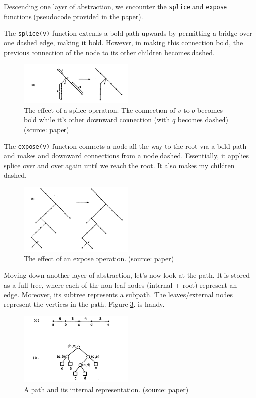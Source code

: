 \documentclass[a4paper, 11pt]{article}
\begin{document}
Descending one layer of abstraction, we encounter the \texttt{splice} and \texttt{expose} functions (pseudocode provided in the paper). 

The \texttt{splice(v)} function extends a bold path upwards by permitting a bridge over one dashed edge, making it bold. However, in making this connection bold, the previous connection of the node to its other children becomes dashed.

\begin{figure}
    \centering
    \includegraphics[width=0.5\textwidth]{img/diagrams/splice.png}
    \caption{The effect of a splice operation. The connection of $v$ to $p$ becomes bold while it's other downward connection (with $q$ becomes dashed) (source: paper)}
    \label{fig:2}
\end{figure}

The \texttt{expose(v)} function connects a node all the way to the root via a bold path and makes and downward connections from a node dashed. Essentially, it applies splice over and over again until we reach the root. It also makes my children dashed.

\begin{figure}
    \centering
    \includegraphics[width=0.5\textwidth]{img/diagrams/expose.png}
    \caption{The effect of an expose operation.  (source: paper)}
    \label{fig:3}
\end{figure}

Moving down another layer of abstraction, let’s now look at the path. It is stored as a full tree, where each of the non-leaf nodes (internal + root) represent an edge. Moreover, its subtree represents a subpath. The leaves/external nodes represent the vertices in the path. Figure \ref{fig:4}. is handy.

\begin{figure}
    \centering
    \includegraphics[width=0.5\textwidth]{img/diagrams/internal_paths.png}
    \caption{A path and its internal representation.  (source: paper)}
    \label{fig:4}
\end{figure}
\end{document}
